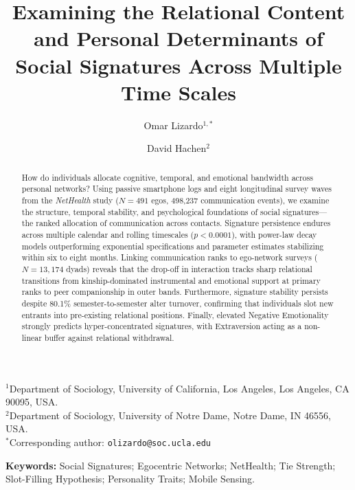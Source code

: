 \documentclass[11pt,letterpaper]{article}
\title{\textbf{Examining the Relational Content and Personal Determinants of Social Signatures Across Multiple Time Scales}}
\author{
  Omar Lizardo$^{1,*}$ \and David Hachen$^{2}$
}
\date{}
\begin{document}
\maketitle

\noindent
$^{1}$Department of Sociology, University of California, Los Angeles, Los Angeles, CA 90095, USA.\\
$^{2}$Department of Sociology, University of Notre Dame, Notre Dame, IN 46556, USA.\\
$^{*}$Corresponding author: \texttt{olizardo@soc.ucla.edu}

\vspace{1.5em}

\begin{abstract}
\noindent
How do individuals allocate cognitive, temporal, and emotional bandwidth across personal networks? Using passive smartphone logs and eight longitudinal survey waves from the \textit{NetHealth} study ($N = 491$ egos, 498,237 communication events), we examine the structure, temporal stability, and psychological foundations of social signatures---the ranked allocation of communication across contacts. Signature persistence endures across multiple calendar and rolling timescales ($p < 0.0001$), with power-law decay models outperforming exponential specifications and parameter estimates stabilizing within six to eight months. Linking communication ranks to ego-network surveys ($N = 13,174$ dyads) reveals that the drop-off in interaction tracks sharp relational transitions from kinship-dominated instrumental and emotional support at primary ranks to peer companionship in outer bands. Furthermore, signature stability persists despite 80.1\% semester-to-semester alter turnover, confirming that individuals slot new entrants into pre-existing relational positions. Finally, elevated Negative Emotionality strongly predicts hyper-concentrated signatures, with Extraversion acting as a non-linear buffer against relational withdrawal.
\end{abstract}

\vspace{1em}
\noindent\textbf{Keywords:} Social Signatures; Egocentric Networks; NetHealth; Tie Strength; Slot-Filling Hypothesis; Personality Traits; Mobile Sensing.

\newpage
\linenumbers

\end{document}
